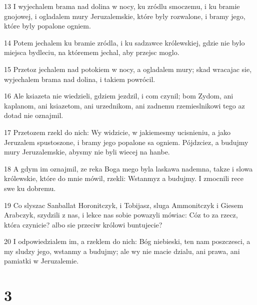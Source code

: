 \par 13 I wyjechalem brama nad dolina w nocy, ku zródlu smoczemu, i ku bramie gnojowej, i ogladalem mury Jeruzalemskie, które byly rozwalone, i bramy jego, które byly popalone ogniem.
\par 14 Potem jechalem ku bramie zródla, i ku sadzawce królewskiej, gdzie nie bylo miejsca bydleciu, na któremem jechal, aby przejsc moglo.
\par 15 Przetoz jechalem nad potokiem w nocy, a ogladalem mury; skad wracajac sie, wyjechalem brama nad dolina, i takiem powrócil.
\par 16 Ale ksiazeta nie wiedzieli, gdziem jezdzil, i com czynil; bom Zydom, ani kaplanom, ani ksiazetom, ani urzednikom, ani zadnemu rzemieslnikowi tego az dotad nie oznajmil.
\par 17 Przetozem rzekl do nich: Wy widzicie, w jakiemesmy ucisnieniu, a jako Jeruzalem spustoszone, i bramy jego popalone sa ogniem. Pójdzciez, a budujmy mury Jeruzalemskie, abysmy nie byli wiecej na hanbe.
\par 18 A gdym im oznajmil, ze reka Boga mego byla laskawa nademna, takze i slowa królewskie, które do mnie mówil, rzekli: Wstanmyz a budujmy. I zmocnili rece swe ku dobremu.
\par 19 Co slyszac Sanballat Horonitczyk, i Tobijasz, sluga Ammonitczyk i Giesem Arabczyk, szydzili z nas, i lekce nas sobie powazyli mówiac: Cóz to za rzecz, która czynicie? albo sie przeciw królowi buntujecie?
\par 20 I odpowiedzialem im, a rzeklem do nich: Bóg niebieski, ten nam poszczesci, a my sludzy jego, wstanmy a budujmy; ale wy nie macie dzialu, ani prawa, ani pamiatki w Jeruzalemie.

\chapter{3}

